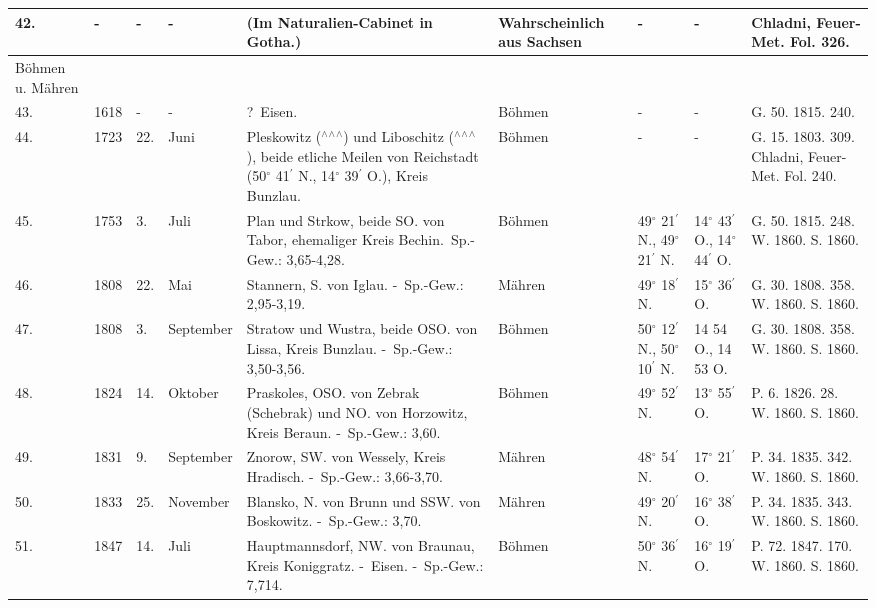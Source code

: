 \documentclass[a4paper, 11pt, oneside, polutonikogreek, german]{article}
\begin{document}
\begin{table}[!ht]
\begin{tabular}{|l|l|l|l|l|l|l|l|l|}
        42. & - & - & - & (Im Naturalien-Cabinet in Gotha.) & Wahrscheinlich aus Sachsen & - & - & Chladni, Feuer-Met. Fol. 326. \\ \hline
        Böhmen u. Mähren &   &   &   &   &   &   &   &   \\ \hline
        43. & 1618 & - & - & ? Eisen. & Böhmen & - & - & G. 50. 1815. 240. \\ \hline
        44. & 1723 & 22. & Juni & Pleskowitz ($^\wedge$$^\wedge$$^\wedge$) und Liboschitz ($^\wedge$$^\wedge$$^\wedge$), beide etliche Meilen von Reichstadt (50$^\circ$ 41$^\prime$ N., 14$^\circ$ 39$^\prime$ O.), Kreis Bunzlau. & Böhmen & - & - & G. 15. 1803. 309. Chladni, Feuer-Met. Fol. 240. \\ \hline
        45. & 1753 & 3. & Juli & Plan und Strkow, beide SO. von Tabor, ehemaliger Kreis Bechin. Sp.-Gew.: 3,65-4,28. & Böhmen & 49$^\circ$ 21$^\prime$ N., 49$^\circ$ 21$^\prime$ N. & 14$^\circ$ 43$^\prime$ O., 14$^\circ$ 44$^\prime$ O. & G. 50. 1815. 248. W. 1860. S. 1860. \\ \hline
        46. & 1808 & 22. & Mai & Stannern, S. von Iglau. - Sp.-Gew.: 2,95-3,19. & Mähren & 49$^\circ$ 18$^\prime$ N. & 15$^\circ$ 36$^\prime$ O. & G. 30. 1808. 358. W. 1860. S. 1860. \\ \hline
        47. & 1808 & 3. & September & Stratow und Wustra, beide OSO. von Lissa, Kreis Bunzlau. - Sp.-Gew.: 3,50-3,56. & Böhmen & 50$^\circ$ 12$^\prime$ N., 50$^\circ$ 10$^\prime$ N. & 14 54 O., 14 53 O. & G. 30. 1808. 358. W. 1860. S. 1860. \\ \hline
        48. & 1824 & 14. & Oktober & Praskoles, OSO. von Zebrak (Schebrak) und NO. von Horzowitz, Kreis Beraun. - Sp.-Gew.: 3,60. & Böhmen & 49$^\circ$ 52$^\prime$ N. & 13$^\circ$ 55$^\prime$ O. & P. 6. 1826. 28. W. 1860. S. 1860. \\ \hline
        49. & 1831 & 9. & September & Znorow, SW. von Wessely, Kreis Hradisch. - Sp.-Gew.: 3,66-3,70. & Mähren & 48$^\circ$ 54$^\prime$ N. & 17$^\circ$ 21$^\prime$ O. & P. 34. 1835. 342. W. 1860. S. 1860. \\ \hline
        50. & 1833 & 25. & November & Blansko, N. von Brunn und SSW. von Boskowitz. - Sp.-Gew.: 3,70. & Mähren & 49$^\circ$ 20$^\prime$ N. & 16$^\circ$ 38$^\prime$ O. & P. 34. 1835. 343. W. 1860. S. 1860. \\ \hline
        51. & 1847 & 14. & Juli & Hauptmannsdorf, NW. von Braunau, Kreis Koniggratz. - Eisen. - Sp.-Gew.: 7,714. & Böhmen & 50$^\circ$ 36$^\prime$ N. & 16$^\circ$ 19$^\prime$ O. & P. 72. 1847. 170. W. 1860. S. 1860. \\ \hline

\end{tabular}
\end{table}
\end{document}
